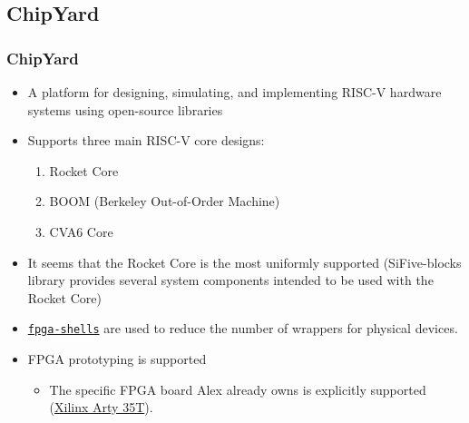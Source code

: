 \documentclass{weeklyslides}
\begin{document}
\subsection{ChipYard}\label{subsec:ChipYard}
\begin{frame}
  \frametitle{ChipYard~\cite{chipyard}}
  \begin{itemize}
  \item A platform for designing, simulating, and implementing RISC-V hardware systems using open-source libraries
  \item Supports three main RISC-V core designs:
    \begin{enumerate}
    \item Rocket Core
    \item BOOM (Berkeley Out-of-Order Machine)
    \item CVA6 Core
    \end{enumerate}
  \item It seems that the Rocket Core is the most uniformly supported (SiFive-blocks library provides several system components intended to be used with the Rocket Core)
  \item \href{https://github.com/sifive/fpga-shells}{\texttt{fpga-shells}} are used to reduce the number of wrappers for physical devices.
  \item FPGA prototyping is supported
    \begin{itemize}
    \item The specific FPGA board Alex already owns is explicitly supported (\href{https://www.xilinx.com/products/boards-and-kits/arty.html}{Xilinx Arty 35T}).
    \end{itemize}
  \end{itemize}
\end{frame}
\end{document}
